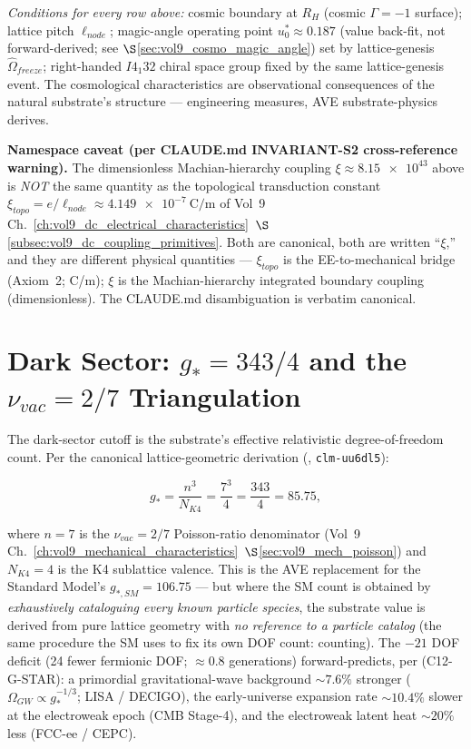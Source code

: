 \noindent
\textit{Conditions for every row above:} cosmic boundary at $R_H$ (cosmic $\Gamma = -1$\gammaundeclared{} surface); lattice pitch $\ell_{node}$; magic-angle operating point $u_0^* \approx 0.187$ (value back-fit, not forward-derived; see $\S$\ref{sec:vol9_cosmo_magic_angle}) set by lattice-genesis $\hat{\Omega}_{freeze}$; right-handed $I4_1 32$ chiral space group fixed by the same lattice-genesis event. The cosmological characteristics are observational consequences of the natural substrate's structure --- engineering measures, AVE substrate-physics derives.

\noindent
\textbf{Namespace caveat (per CLAUDE.md INVARIANT-S2 cross-reference warning).} The dimensionless Machian-hierarchy coupling $\xi \approx \num{8.15e43}$ above is \emph{NOT} the same quantity as the topological transduction constant $\xi_{topo} = e/\ell_{node} \approx \qty{4.149e-7}{\coulomb\per\metre}$ of Vol~9 Ch.~\ref{ch:vol9_dc_electrical_characteristics}~$\S$\ref{subsec:vol9_dc_coupling_primitives}. Both are canonical, both are written ``$\xi$,'' and they are different physical quantities --- $\xi_{topo}$ is the EE-to-mechanical bridge (Axiom~2; C/m); $\xi$ is the Machian-hierarchy integrated boundary coupling (dimensionless). The CLAUDE.md disambiguation is verbatim canonical.

\section{Dark Sector: $g_* = 343/4$ and the $\nu_{vac} = 2/7$ Triangulation}
\label{sec:vol9_cosmo_dark_sector}

The dark-sector cutoff is the substrate's effective relativistic degree-of-freedom count. Per the canonical lattice-geometric derivation (, \texttt{clm-uu6dl5}):

\[
g_* = \frac{n^3}{N_{K4}} = \frac{7^3}{4} = \frac{343}{4} = 85.75,
\]

where $n = 7$ is the $\nu_{vac} = 2/7$ Poisson-ratio denominator (Vol~9 Ch.~\ref{ch:vol9_mechanical_characteristics}~$\S$\ref{sec:vol9_mech_poisson}) and $N_{K4} = 4$ is the K4 sublattice valence. This is the AVE replacement for the Standard Model's $g_{*,SM} = 106.75$ --- but where the SM count is obtained by \emph{exhaustively cataloguing every known particle species}, the substrate value is derived from pure lattice geometry with \emph{no reference to a particle catalog} (the same procedure the SM uses to fix its own DOF count: counting). The $-21$ DOF deficit (24 fewer fermionic DOF; $\approx 0.8$ generations) forward-predicts, per  (C12-G-STAR): a primordial gravitational-wave background $\sim 7.6\%$ stronger ($\Omega_{GW} \propto g_*^{-1/3}$; LISA / DECIGO), the early-universe expansion rate $\sim 10.4\%$ slower at the electroweak epoch (CMB Stage-4), and the electroweak latent heat $\sim 20\%$ less (FCC-ee / CEPC).

